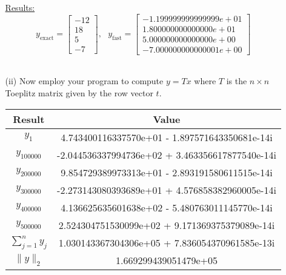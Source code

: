 \documentclass[12pt]{article}
\begin{document}
\begin{itemize}
\begin{itemize}
\underline{Results:} \\
$$y_{\text{exact}} = \begin{bmatrix}
						-12 \\
						18 \\
						5 \\
						-7
						\end{bmatrix}, \text{ } y_{\text{fast}} = \begin{bmatrix}
					-1.199999999999999e+01 \\
     				1.800000000000000e+01 \\
     				5.000000000000000e+00 \\
    					-7.000000000000001e+00 
    					\end{bmatrix}$$\\

\item[(ii)] Now employ your program to compute $y=Tx$ where $T$ is the $n\times n$ Toeplitz matrix given by the row vector $t$.\\
 
 
\begin{table}[H]
\centering
\renewcommand{\arraystretch}{1.3}
\begin{tabular}{| c | c |}
\hline
Result &  Value\\
\hline 
$y_1$ & 4.743400116337570e+01 - 1.897571643350681e-14i\\

$y_{100000}$ &  -2.044536337994736e+02 + 3.463356617877540e-14i \\

$y_{200000}$ & 9.854729389973313e+01 - 2.893191580611515e-14i \\

$y_{300000}$ & -2.273143080393689e+01 + 4.576858382960005e-14i\\

$y_{400000}$ &  4.136625635601638e+02 - 5.480763011145770e-14i \\

$y_{500000}$ & 2.524304751530099e+02 + 9.171369375379089e-14i \\

$\displaystyle \sum_{j=1}^n y_j $ &  1.030143367304306e+05 + 7.836054370961585e-13i\\

$\|y\|_2$ &  1.669299439051479e+05\\
\hline
\end{tabular}
\end{table} 
 

 
\end{itemize}
 
 
\end{itemize}
\end{document}
